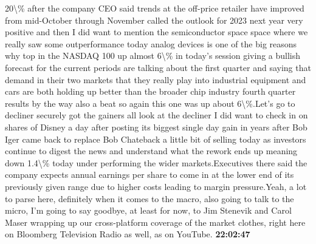 \documentclass{article}%
\begin{document}
20\textbackslash{}\% after the company CEO said trends at the off{-}price retailer have improved from mid{-}October through November called the outlook for 2023 next year very positive and then I did want to mention the semiconductor space space where we really saw some outperformance today analog devices is one of the big reasons why top in the NASDAQ 100 up almost 6\textbackslash{}\% in today's session giving a bullish forecast for the current periods are talking about the first quarter and saying that demand in their two markets that they really play into industrial equipment and cars are both holding up better than the broader chip industry fourth quarter results by the way also a beat so again this one was up about 6\textbackslash{}\%.Let's go to decliner securely got the gainers all look at the decliner I did want to check in on shares of Disney a day after posting its biggest single day gain in years after Bob Iger came back to replace Bob Chateback a little bit of selling today as investors continue to digest the news and understand what the rework ends up meaning down 1.4\textbackslash{}\% today under performing the wider markets.Executives there said the company expects annual earnings per share to come in at the lower end of its previously given range due to higher costs leading to margin pressure.Yeah, a lot to parse here, definitely when it comes to the macro, also going to talk to the micro, I'm going to say goodbye, at least for now, to Jim Stenevik and Carol Maser wrapping up our cross{-}platform coverage of the market clothes, right here on Bloomberg Television Radio as well, as on YouTube.%
\textbf{22:02:47}%
\newline%
\end{document}
